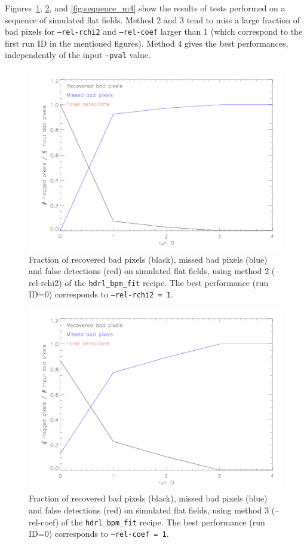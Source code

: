 Figures~\ref{fig:sequence_m2}, \ref{fig:sequence_m3}, and
\ref{fig:sequence_m4} show the results of tests performed on a
sequence of simulated flat fields. Method 2 and 3 tend to miss a large
fraction of bad pixels for {\tt --rel-rchi2} and {\tt --rel-coef}
larger than 1 (which correspond to the first run ID in the mentioned
figures).  Method 4 gives the best performances, independently of the
input {\tt --pval} value.

\begin{figure}
 \subfigure
\includegraphics[width=15cm]{figures/results_2.png}
 \caption{Fraction of recovered bad pixels (black), missed bad pixels
   (blue) and false detections (red) on simulated flat fields, using
   method 2 (--rel-rchi2) of the {\tt hdrl\_bpm\_fit} recipe. The best
   performance (run ID=0) corresponds to {\tt --rel-rchi2 = 1}.}
 \label{fig:sequence_m2}
\end{figure}


\begin{figure}
 \subfigure
\includegraphics[width=15cm]{figures/results_3.png}
 \caption{Fraction of recovered bad pixels (black), missed bad pixels
   (blue) and false detections (red) on simulated flat fields, using
   method 3 (--rel-coef) of the  {\tt hdrl\_bpm\_fit}  recipe. The best
   performance (run ID=0) corresponds to {\tt --rel-coef = 1}.}
 \label{fig:sequence_m3}
\end{figure}


